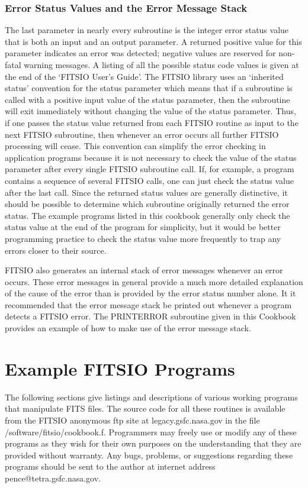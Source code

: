 \subsection{Error Status Values and the Error Message Stack}

The last parameter in nearly every subroutine is the integer error
status value that is both an input and an output parameter.  A returned
positive value for this parameter indicates an error was detected;
negative values are reserved for non-fatal warning messages.  A listing
of all the possible status code values is given at the end of the
`FITSIO User's Guide'.  The FITSIO library uses an `inherited status'
convention for the status parameter which means that if a subroutine is
called with a positive input value of the status parameter, then the
subroutine will exit immediately without changing the value of the
status parameter.  Thus, if one passes the status value returned from
each FITSIO routine as input to the next FITSIO subroutine, then
whenever an error occurs all further FITSIO processing will cease.
This convention can simplify the error checking in application programs
because it is not necessary to check the value of the status parameter
after every single FITSIO subroutine call.  If, for example, a program
contains a sequence of several FITSIO calls, one can just check the
status value after the last call.  Since the returned status values are
generally distinctive, it should be possible to determine which
subroutine originally returned the error status.  The example programs
listed in this cookbook generally only check the status value at the
end of the program for simplicity, but it would be better programming
practice to check the status value more frequently to trap any errors
closer to their source.

FITSIO also generates an internal stack of error messages whenever an
error occurs.  These error messages in general provide a much more
detailed explanation of the cause of the error than is provided by the
error status number alone.  It it recommended that the error message
stack be printed out whenever a program detects a FITSIO error.  The
PRINTERROR subroutine given in this Cookbook provides an example of how
to make use of the error message stack.

\chapter{Example FITSIO Programs}

The following sections give listings and descriptions of various
working programs that manipulate FITS files.  The source code for all
these routines is available from the FITSIO anonymous ftp site at
legacy.gsfc.nasa.gov in the file /software/fitsio/cookbook.f.
Programmers may freely use or modify any of these programs as they wish
for their own purposes on the understanding that they are provided
without warranty.  Any bugs, problems, or suggestions regarding these
programs should be sent to the author at internet address
pence@tetra.gsfc.nasa.gov.

